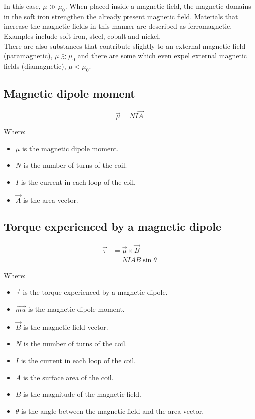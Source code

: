 \documentclass[11pt]{article}
\begin{document}
In this case, \(\mu \gg \mu_0\). When placed inside a magnetic field, the magnetic domains in the soft iron strengthen the already present magnetic field. Materials that increase the magnetic fields in this manner are described as ferromagnetic. Examples include soft iron, steel, cobalt and nickel.
\\[0pt]

There are also substances that contribute slightly to an external magnetic field (paramagnetic), \(\mu \gtrsim \mu_0\) and there are some which even expel external magnetic fields (diamagnetic), \(\mu < \mu_0\).

\subsection{Magnetic dipole moment}
\label{sec:orgd0b1727}
\[\vec{\mu} = NI \vec{A}\]

Where:
\begin{itemize}
\item \(\mu\) is the magnetic dipole moment.
\item \(N\) is the number of turns of the coil.
\item \(I\) is the current in each loop of the coil.
\item \(\vec{A}\) is the area vector.
\end{itemize}

\subsection{Torque experienced by a magnetic dipole}
\label{sec:org57301a3}
\begin{align*}
\vec{\tau} &= \vec{\mu} \times \vec{B} \\
&= NIA B \sin \theta
\end{align*}

Where:
\begin{itemize}
\item \(\vec{\tau}\) is the torque experienced by a magnetic dipole.
\item \(\vec{mu}\) is the magnetic dipole moment.
\item \(\vec{B}\) is the magnetic field vector.
\item \(N\) is the number of turns of the coil.
\item \(I\) is the current in each loop of the coil.
\item \(A\) is the surface area of the coil.
\item \(B\) is the magnitude of the magnetic field.
\item \(\theta\) is the angle between the magnetic field and the area vector.
\end{itemize}
\end{document}
